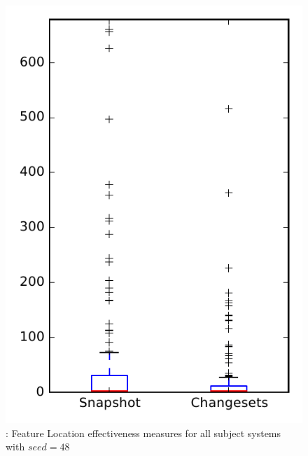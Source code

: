 
\begin{figure}
\centering
\includegraphics[height=0.4\textheight]{figures/flt_seed/rq1_overview_48}
\caption{\rone: Feature Location effectiveness measures for all subject systems with $seed=48$}
\label{fig:flt_seed:rq1:overview}
\end{figure}
